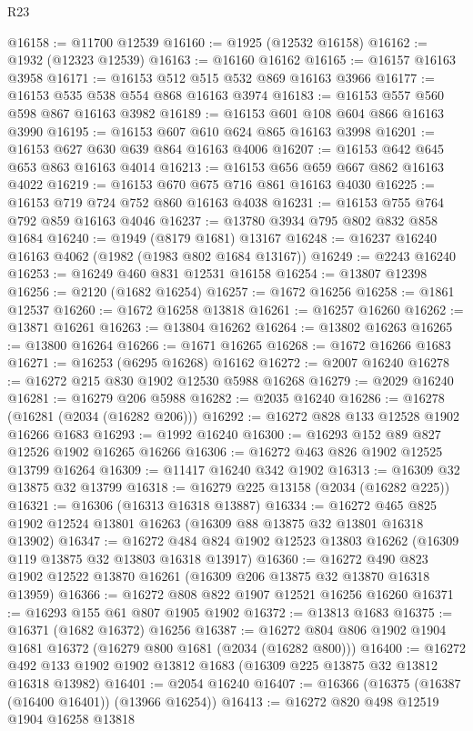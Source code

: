 \begin{lexlean}{R23}
\begin{coremodule}
@16158 := @11700 @12539
@16160 := @1925 (@12532 @16158)
@16162 := @1932 (@12323 @12539)
@16163 := @16160 @16162
@16165 := @16157 @16163 @3958
@16171 := @16153 @512 @515 @532 @869 @16163 @3966
@16177 := @16153 @535 @538 @554 @868 @16163 @3974
@16183 := @16153 @557 @560 @598 @867 @16163 @3982
@16189 := @16153 @601 @108 @604 @866 @16163 @3990
@16195 := @16153 @607 @610 @624 @865 @16163 @3998
@16201 := @16153 @627 @630 @639 @864 @16163 @4006
@16207 := @16153 @642 @645 @653 @863 @16163 @4014
@16213 := @16153 @656 @659 @667 @862 @16163 @4022
@16219 := @16153 @670 @675 @716 @861 @16163 @4030
@16225 := @16153 @719 @724 @752 @860 @16163 @4038
@16231 := @16153 @755 @764 @792 @859 @16163 @4046
@16237 := @13780 @3934 @795 @802 @832 @858 @1684
@16240 := @1949 (@8179 @1681) @13167
@16248 := @16237 @16240 @16163 @4062 (@1982 (@1983 @802 @1684 @13167))
@16249 := @2243 @16240
@16253 := @16249 @460 @831 @12531 @16158
@16254 := @13807 @12398
@16256 := @2120 (@1682 @16254)
@16257 := @1672 @16256
@16258 := @1861 @12537
@16260 := @1672 @16258 @13818
@16261 := @16257 @16260
@16262 := @13871 @16261
@16263 := @13804 @16262
@16264 := @13802 @16263
@16265 := @13800 @16264
@16266 := @1671 @16265
@16268 := @1672 @16266 @1683
@16271 := @16253 (@6295 @16268) @16162
@16272 := @2007 @16240
@16278 := @16272 @215 @830 @1902 @12530 @5988 @16268
@16279 := @2029 @16240
@16281 := @16279 @206 @5988
@16282 := @2035 @16240
@16286 := @16278 (@16281 (@2034 (@16282 @206)))
@16292 := @16272 @828 @133 @12528 @1902 @16266 @1683
@16293 := @1992 @16240
@16300 := @16293 @152 @89 @827 @12526 @1902 @16265 @16266
@16306 := @16272 @463 @826 @1902 @12525 @13799 @16264
@16309 := @11417 @16240 @342 @1902
@16313 := @16309 @32 @13875 @32 @13799
@16318 := @16279 @225 @13158 (@2034 (@16282 @225))
@16321 := @16306 (@16313 @16318 @13887)
@16334 := @16272 @465 @825 @1902 @12524 @13801 @16263 (@16309 @88 @13875 @32 @13801 @16318 @13902)
@16347 := @16272 @484 @824 @1902 @12523 @13803 @16262 (@16309 @119 @13875 @32 @13803 @16318 @13917)
@16360 := @16272 @490 @823 @1902 @12522 @13870 @16261 (@16309 @206 @13875 @32 @13870 @16318 @13959)
@16366 := @16272 @808 @822 @1907 @12521 @16256 @16260
@16371 := @16293 @155 @61 @807 @1905 @1902
@16372 := @13813 @1683
@16375 := @16371 (@1682 @16372) @16256
@16387 := @16272 @804 @806 @1902 @1904 @1681 @16372 (@16279 @800 @1681 (@2034 (@16282 @800)))
@16400 := @16272 @492 @133 @1902 @1902 @13812 @1683 (@16309 @225 @13875 @32 @13812 @16318 @13982)
@16401 := @2054 @16240
@16407 := @16366 (@16375 (@16387 (@16400 @16401)) (@13966 @16254))
@16413 := @16272 @820 @498 @12519 @1904 @16258 @13818

\end{coremodule}
\end{lexlean}
